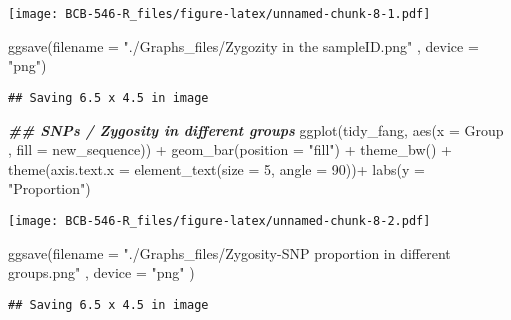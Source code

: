 \documentclass[
]{article}
\newenvironment{Shaded}{\begin{snugshade}}{\end{snugshade}}
\newcommand{\AttributeTok}[1]{\textcolor[rgb]{0.77,0.63,0.00}{#1}}
\newcommand{\DecValTok}[1]{\textcolor[rgb]{0.00,0.00,0.81}{#1}}
\newcommand{\DocumentationTok}[1]{\textcolor[rgb]{0.56,0.35,0.01}{\textbf{\textit{#1}}}}
\newcommand{\FunctionTok}[1]{\textcolor[rgb]{0.00,0.00,0.00}{#1}}
\newcommand{\NormalTok}[1]{#1}
\newcommand{\SpecialCharTok}[1]{\textcolor[rgb]{0.00,0.00,0.00}{#1}}
\newcommand{\StringTok}[1]{\textcolor[rgb]{0.31,0.60,0.02}{#1}}
\begin{document}
\texttt{[image: BCB-546-R\_files/figure-latex/unnamed-chunk-8-1.pdf]}

\begin{Shaded}
\begin{Highlighting}[]
\FunctionTok{ggsave}\NormalTok{(}\AttributeTok{filename =} \StringTok{"./Graphs\_files/Zygozity in the sampleID.png"}\NormalTok{ , }\AttributeTok{device =} \StringTok{"png"}\NormalTok{)}
\end{Highlighting}
\end{Shaded}

\begin{verbatim}
## Saving 6.5 x 4.5 in image
\end{verbatim}

\begin{Shaded}
\begin{Highlighting}[]
\DocumentationTok{\#\# SNPs / Zygosity in different groups}
\FunctionTok{ggplot}\NormalTok{(tidy\_fang, }\FunctionTok{aes}\NormalTok{(}\AttributeTok{x =}\NormalTok{ Group , }\AttributeTok{fill =}\NormalTok{ new\_sequence)) }\SpecialCharTok{+} \FunctionTok{geom\_bar}\NormalTok{(}\AttributeTok{position =} \StringTok{"fill"}\NormalTok{) }\SpecialCharTok{+} 
  \FunctionTok{theme\_bw}\NormalTok{() }\SpecialCharTok{+} \FunctionTok{theme}\NormalTok{(}\AttributeTok{axis.text.x =} \FunctionTok{element\_text}\NormalTok{(}\AttributeTok{size =} \DecValTok{5}\NormalTok{, }\AttributeTok{angle =} \DecValTok{90}\NormalTok{))}\SpecialCharTok{+} \FunctionTok{labs}\NormalTok{(}\AttributeTok{y =} \StringTok{"Proportion"}\NormalTok{)}
\end{Highlighting}
\end{Shaded}

\texttt{[image: BCB-546-R\_files/figure-latex/unnamed-chunk-8-2.pdf]}

\begin{Shaded}
\begin{Highlighting}[]
\FunctionTok{ggsave}\NormalTok{(}\AttributeTok{filename =} \StringTok{"./Graphs\_files/Zygosity{-}SNP proportion in different groups.png"}\NormalTok{ , }\AttributeTok{device =} \StringTok{"png"}\NormalTok{ )}
\end{Highlighting}
\end{Shaded}

\begin{verbatim}
## Saving 6.5 x 4.5 in image
\end{verbatim}
\end{document}
